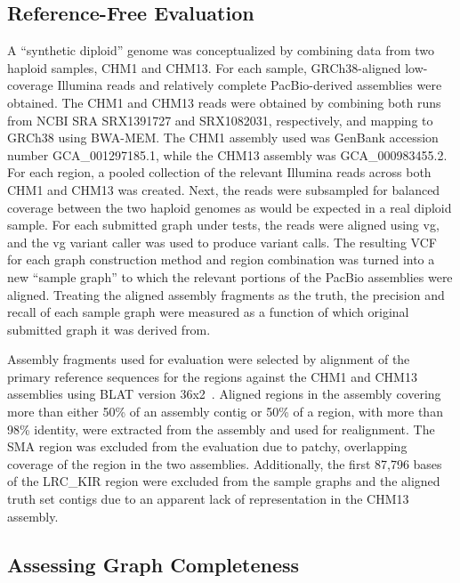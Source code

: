 \subsection{Reference-Free Evaluation}

A ``synthetic diploid'' genome was conceptualized by combining data from
two haploid samples, CHM1 and CHM13\cite{Steinberg2014-pu}. For each
sample, GRCh38-aligned low-coverage Illumina reads and relatively
complete PacBio-derived assemblies were obtained. The CHM1 and CHM13
reads were obtained by combining both runs from NCBI SRA SRX1391727 and
SRX1082031, respectively, and mapping to GRCh38 using
BWA-MEM\cite{li2009fast}. The CHM1 assembly used was GenBank accession
number GCA\_001297185.1, while the CHM13 assembly was GCA\_000983455.2.
For each region, a pooled collection of the relevant Illumina reads
across both CHM1 and CHM13 was created. Next, the reads were subsampled
for balanced coverage between the two haploid genomes as would be
expected in a real diploid sample. For each submitted graph under tests,
the reads were aligned using vg, and the vg variant caller was used to
produce variant calls. The resulting VCF for each graph construction
method and region combination was turned into a new ``sample graph'' to
which the relevant portions of the PacBio assemblies were aligned.
Treating the aligned assembly fragments as the truth, the precision and
recall of each sample graph were measured as a function of which
original submitted graph it was derived from.

Assembly fragments used for evaluation were selected by alignment of the
primary reference sequences for the regions against the CHM1 and CHM13
assemblies using BLAT version 36x2~\cite{Kent2002-wo}. Aligned regions
in the assembly covering more than either 50\% of an assembly contig or
50\% of a region, with more than 98\% identity, were extracted from the
assembly and used for realignment. The SMA region was excluded from the
evaluation due to patchy, overlapping coverage of the region in the two
assemblies. Additionally, the first 87,796 bases of the LRC\_KIR region
were excluded from the sample graphs and the aligned truth set contigs
due to an apparent lack of representation in the CHM13 assembly.

\subsection{Assessing Graph Completeness}

